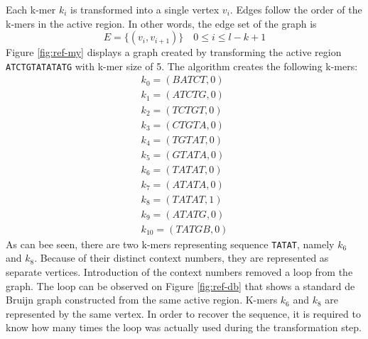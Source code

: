 Each k-mer $k_i$ is transformed into a single vertex $v_i$. Edges follow the order of the k-mers in the active region. In other words, the edge set of the graph is
$$
E = \{(v_i, v_{i+1})\}\quad 0 \leq i \leq l-k+1
$$
Figure \ref{fig:ref-my} displays a graph created by transforming the active region \texttt{ATCTGTATATATG} with k-mer size of 5. The algorithm creates the following k-mers:
\begin{align*}
k_0 = (BATCT, 0) \\
k_1 = (ATCTG, 0) \\
k_2 = (TCTGT, 0) \\
k_3 = (CTGTA, 0) \\
k_4 = (TGTAT, 0) \\
k_5 = (GTATA, 0) \\
k_6 = (TATAT, 0) \\
k_7 = (ATATA, 0) \\
k_8 = (TATAT, 1) \\
k_9 = (ATATG, 0) \\
k_{10} = (TATGB, 0)
\end{align*}
As can bee seen, there are two k-mers representing sequence \texttt{TATAT}, namely $k_6$ and $k_8$. Because of their distinct context numbers, they are represented as separate vertices. Introduction of the context numbers removed a loop from the graph. The loop can be observed on Figure \ref{fig:ref-db} that shows a standard de Bruijn graph constructed from the same active region. K-mers $k_6$ and $k_8$ are represented by the same vertex. In order to recover the sequence, it is required to know how many times the loop was actually used during the transformation step.

